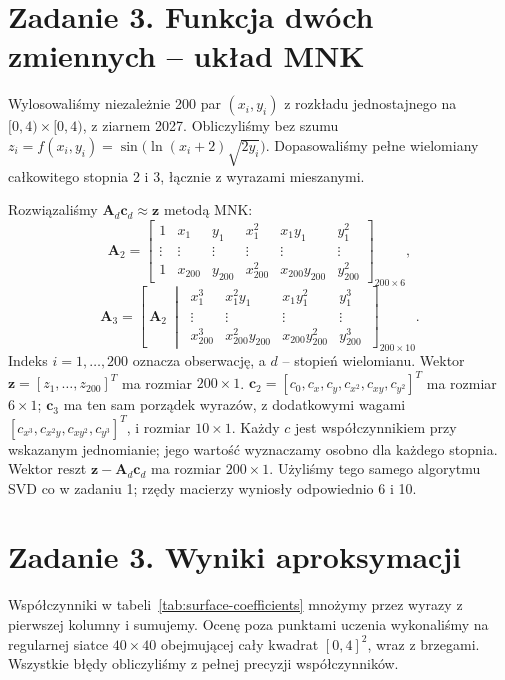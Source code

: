\documentclass[10pt,a4paper]{article}
\begin{document}
\section*{Zadanie 3. Funkcja dwóch zmiennych -- układ MNK}
Wylosowaliśmy niezależnie 200 par $(x_i,y_i)$ z rozkładu jednostajnego
na $[0,4)\times[0,4)$, z ziarnem 2027. Obliczyliśmy bez szumu
$z_i=f(x_i,y_i)=\sin\!\bigl(\ln(x_i+2)\sqrt{2y_i}\bigr)$.
Dopasowaliśmy pełne wielomiany całkowitego stopnia 2 i 3, łącznie z wyrazami mieszanymi.

Rozwiązaliśmy $\mathbf A_d\mathbf c_d\approx\mathbf z$ metodą MNK:
\[
\mathbf A_2=\begin{bmatrix}
1&x_1&y_1&x_1^2&x_1y_1&y_1^2\\
\vdots&\vdots&\vdots&\vdots&\vdots&\vdots\\
1&x_{200}&y_{200}&x_{200}^2&x_{200}y_{200}&y_{200}^2
\end{bmatrix}_{200\times6},
\]
\[
\mathbf A_3=\left[\ \mathbf A_2\ \middle|\ \begin{matrix}
x_1^3&x_1^2y_1&x_1y_1^2&y_1^3\\
\vdots&\vdots&\vdots&\vdots\\
x_{200}^3&x_{200}^2y_{200}&x_{200}y_{200}^2&y_{200}^3
\end{matrix}\ \right]_{200\times10}.
\]
Indeks $i=1,\ldots,200$ oznacza obserwację, a $d$ -- stopień wielomianu.
Wektor $\mathbf z=[z_1,\ldots,z_{200}]^T$ ma rozmiar $200\times1$.
$\mathbf c_2=[c_0,c_x,c_y,c_{x^2},c_{xy},c_{y^2}]^T$ ma rozmiar $6\times1$;
$\mathbf c_3$ ma ten sam porządek wyrazów, z dodatkowymi wagami
$[c_{x^3},c_{x^2y},c_{xy^2},c_{y^3}]^T$, i rozmiar $10\times1$.
Każdy $c$ jest współczynnikiem przy wskazanym jednomianie; jego wartość wyznaczamy osobno dla każdego stopnia.
Wektor reszt $\mathbf z-\mathbf A_d\mathbf c_d$ ma rozmiar $200\times1$.
Użyliśmy tego samego algorytmu SVD co w zadaniu 1; rzędy macierzy wyniosły odpowiednio 6 i 10.

\clearpage
\section*{Zadanie 3. Wyniki aproksymacji}
Współczynniki w tabeli~\ref{tab:surface-coefficients} mnożymy przez wyrazy z pierwszej kolumny i sumujemy.
Ocenę poza punktami uczenia wykonaliśmy na regularnej siatce $40\times40$
obejmującej cały kwadrat $[0,4]^2$, wraz z brzegami.
Wszystkie błędy obliczyliśmy z pełnej precyzji współczynników.
\end{document}

